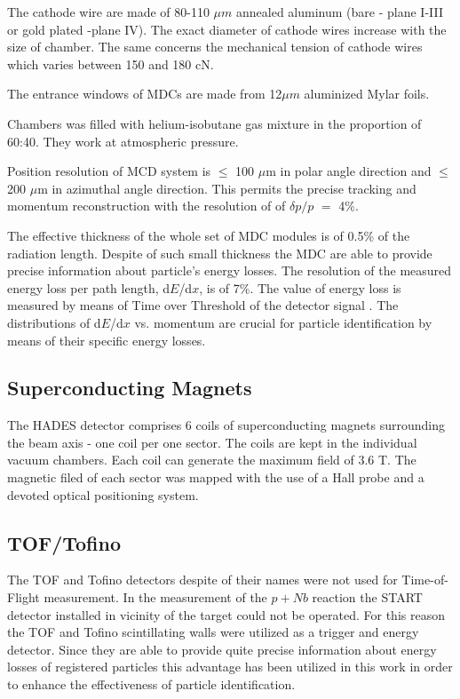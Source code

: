 The cathode wire are made of 80-110 $\mu m$ annealed aluminum 
(bare - plane I-III or gold plated -plane IV). 
The exact diameter of cathode wires increase with the size of chamber.
The same concerns the mechanical tension of cathode wires which varies between 150 and 180 cN.

The entrance windows of  MDCs are made from 12$\mu m$ aluminized Mylar foils.

Chambers was filled with helium-isobutane gas mixture in the proportion of 60:40. They work at atmospheric pressure.  

Position resolution of MCD system is $\le$ 100 $\mu$m in polar angle direction and $\le$ 200 $\mu$m 
in azimuthal angle direction. This permits the precise tracking and momentum reconstruction 
with the resolution of of $\delta{p}/p$ $=$ 4\%.

The effective thickness of the whole set of MDC modules is of 0.5\% of the radiation length. 
Despite of such small thickness the MDC are able to provide precise information 
about particle's energy losses. The resolution of the measured energy loss per path length, 
d$E$/d$x$, is of 7\%. The value of energy loss is measured by means of Time over Threshold 
of the detector signal \cite{Kipnis}. 
The distributions of d$E$/d$x$ vs. momentum are crucial for particle identification by means 
of their specific energy losses.



\subsection{Superconducting Magnets}

The HADES detector comprises 6 coils of superconducting magnets surrounding 
the beam axis - one coil per one sector. The coils are kept in the individual vacuum chambers. 
Each coil can generate the maximum field of 3.6 T. 
The magnetic filed of each sector was mapped with the use of a Hall probe 
and a devoted optical positioning system. 

\subsection{TOF/Tofino}

The TOF and Tofino detectors despite of their names were not used for Time-of-Flight measurement.
In the measurement of the $p+Nb$ reaction the START detector installed in vicinity of the target could not be operated.
For this reason the TOF and Tofino scintillating walls were utilized as a trigger and energy detector. 
Since they are able to provide quite precise information about energy losses of registered particles  
this advantage has been utilized in this work in order to enhance the effectiveness of particle identification.  

